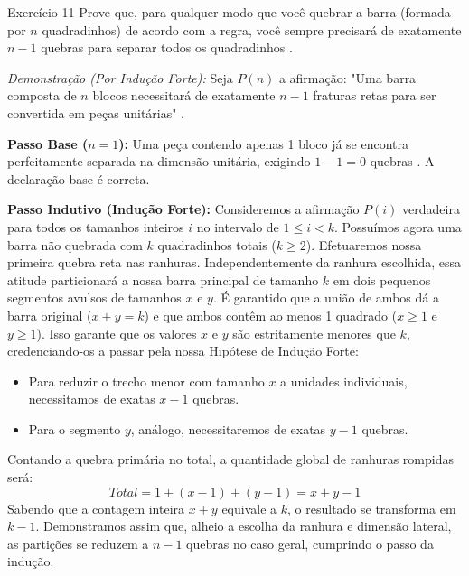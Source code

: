 \documentclass[a4paper,11pt]{article}
\theoremstyle{definition}
\theoremstyle{plain}
\theoremstyle{remark}
\newcounter{questao}[section]
\begin{document}
\newpage \begin{questaoManually}{Exercício 11}
Prove que, para qualquer modo que você quebrar a barra (formada por $n$ quadradinhos) de acordo com a regra, você sempre precisará de exatamente $n - 1$ quebras para separar todos os quadradinhos .

\textit{Demonstração (Por Indução Forte):}
Seja $P(n)$ a afirmação: "Uma barra composta de $n$ blocos necessitará de exatamente $n-1$ fraturas retas para ser convertida em peças unitárias" .

\textbf{Passo Base ($n=1$):}
Uma peça contendo apenas 1 bloco já se encontra perfeitamente separada na dimensão unitária, exigindo $1 - 1 = 0$ quebras . A declaração base é correta.

\textbf{Passo Indutivo (Indução Forte):}
Consideremos a afirmação $P(i)$ verdadeira para todos os tamanhos inteiros $i$ no intervalo de $1 \le i < k$.
Possuímos agora uma barra não quebrada com $k$ quadradinhos totais ($k \ge 2$). Efetuaremos nossa primeira quebra reta nas ranhuras. Independentemente da ranhura escolhida, essa atitude particionará a nossa barra principal de tamanho $k$ em dois pequenos segmentos avulsos de tamanhos $x$ e $y$.
É garantido que a união de ambos dá a barra original ($x + y = k$) e que ambos contêm ao menos 1 quadrado ($x \ge 1$ e $y \ge 1$). Isso garante que os valores $x$ e $y$ são estritamente menores que $k$, credenciando-os a passar pela nossa Hipótese de Indução Forte:
\begin{itemize}
    \item Para reduzir o trecho menor com tamanho $x$ a unidades individuais, necessitamos de exatas $x - 1$ quebras.
    \item Para o segmento $y$, análogo, necessitaremos de exatas $y - 1$ quebras.
\end{itemize}
Contando a quebra primária no total, a quantidade global de ranhuras rompidas será:
\begin{equation}
Total = 1 + (x - 1) + (y - 1) = x + y - 1
\end{equation}
Sabendo que a contagem inteira $x+y$ equivale a $k$, o resultado se transforma em $k - 1$.
Demonstramos assim que, alheio a escolha da ranhura e dimensão lateral, as partições se reduzem a $n-1$ quebras no caso geral, cumprindo o passo da indução. \blacksquare
\end{questaoManually}
\end{document}
